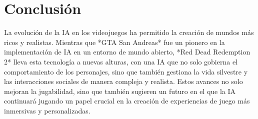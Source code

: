 \documentclass[10pt]{article}
\begin{document}
\section{Conclusión}
La evolución de la IA en los videojuegos ha permitido la creación de mundos más ricos y realistas. Mientras que *GTA San Andreas* fue un pionero en la implementación de IA en un entorno de mundo abierto, *Red Dead Redemption 2* lleva esta tecnología a nuevas alturas, con una IA que no solo gobierna el comportamiento de los personajes, sino que también gestiona la vida silvestre y las interacciones sociales de manera compleja y realista. Estos avances no solo mejoran la jugabilidad, sino que también sugieren un futuro en el que la IA continuará jugando un papel crucial en la creación de experiencias de juego más inmersivas y personalizadas.
\end{document}
